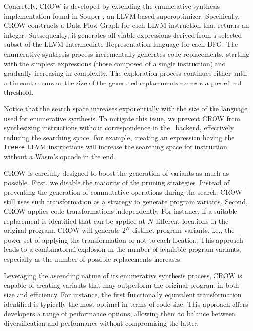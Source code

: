 Concretely, CROW is developed by extending the enumerative synthesis implementation found in Souper \cite{Sasnauskas2017Souper:Superoptimizer}, an LLVM-based superoptimizer. 
Specifically, CROW constructs a Data Flow Graph for each LLVM instruction that returns an integer. 
Subsequently, it generates all viable expressions derived from a selected subset of the LLVM Intermediate Representation language for each DFG.
The enumerative synthesis process incrementally generates code replacements, starting with the simplest expressions (those composed of a single instruction) and gradually increasing in complexity. 
The exploration process continues either until a timeout occurs or the size of the generated replacements exceeds a predefined threshold.


Notice that the search space increases exponentially with the size of the language used for enumerative synthesis. 
To mitigate this issue, we prevent CROW from synthesizing instructions without correspondence in the \wasm\ backend, effectively reducing the searching space. 
For example, creating an expression having the  \texttt{freeze} LLVM instructions will increase the searching space for instruction without a Wasm's opcode in the end.

CROW is carefully designed to boost the generation of variants as much as possible.
First, we disable the majority of the pruning strategies.
Instead of preventing the generation of commutative operations during the search, CROW still uses such transformation as a strategy to generate program variants. 
Second, CROW applies code transformations independently. 
For instance, if a suitable replacement is identified that can be applied at $N$ different locations in the original program, CROW will generate $2^N$ distinct program variants, i.e., the power set of applying the transformation or not to each location. 
This approach leads to a combinatorial explosion in the number of available program variants, especially as the number of possible replacements increases.

Leveraging the ascending nature of its enumerative synthesis process, CROW is capable of creating variants that may outperform the original program in both size and efficiency. 
For instance, the first functionally equivalent transformation identified is typically the most optimal in terms of code size. 
This approach offers developers a range of performance options, allowing them to balance between diversification and performance without compromising the latter.


